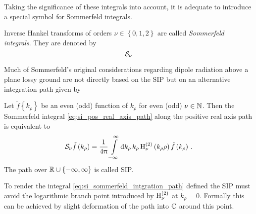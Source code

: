 Taking the significance of these integrals into account, it is adequate to
introduce a special symbol for Sommerfeld integrals.
\begin{definition}	
	Inverse Hankel transforms of orders $\nu \in \left\{0, 1, 2\right\}$
	are called \emph{Sommerfeld integrals}.
	They are denoted by
	\begin{equation}\label{eq:si_pos_real_axis_path}
		\mathcal{S}_{\nu}
	\end{equation}
\end{definition}

Much of Sommerfeld's original considerations \cite{Sommerfeld1909} regarding
dipole radiation above a plane lossy ground are not directly based on the
\ac{SIP} but on an alternative integration path given by
\begin{corollary}
	Let $\tilde{f} \left\{k_\rho\right\}$ be an even (odd) function of $k_\rho$
	for even (odd) $\nu \in \mathbb{N}$.
	Then the Sommerfeld integral \eqref{eq:si_pos_real_axis_path}
	along the positive real axis path is equivalent to
	\begin{equation}\label{eq:si_sommerfeld_intgration_path}
		\mathcal{S}_{\nu}{\tilde{f} \left( k_\rho \right)} =
		\frac{1}{4\uppi}
		\int\limits_{-\infty}^{\infty} \mathrm{d} k_\rho \, k_\rho
		\operatorname{H}_{\nu}^{\left( 2 \right)} \left(k_\rho \rho\right)
		\tilde{f} \left(k_\rho\right) \, .
	\end{equation}
	The path over $\mathbb{R} \cup \left\{-\infty, \infty\right\}$
	is called \acf{SIP}\cite[p.~66]{Chew1999}.
\end{corollary}

\begin{remark}
	To render the integral \eqref{eq:si_sommerfeld_intgration_path} defined
	the \ac{SIP} must avoid the logarithmic branch point introduced by
	$\operatorname{H}_{\nu}^{\left( 2 \right)}$ at $k_\rho = 0$.
	Formally this can be achieved by slight deformation of the path into
	$\mathbb{C}$ around this point.
\end{remark}

